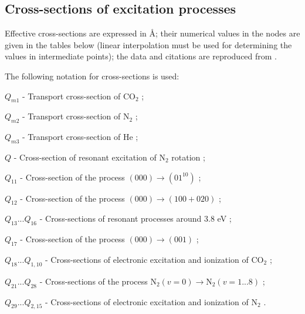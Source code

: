 \documentclass{report}
\begin{document}
\begin{appendices}


\chapter{Cross-sections of excitation processes}
\label{appendix:crossections}

Effective cross-sections are expressed in Å; their numerical values in the nodes are given in the tables below (linear interpolation must be used for determining the values in intermediate points); the data and citations are reproduced from \cite{Karlov-1978}.


The following notation for cross-sections is used:

$Q_{m1}$ - Transport cross-section of {CO$_2$} \cite{Lowke-1973};

$Q_{m2}$ - Transport cross-section of {N$_2$} \cite{Frost-1962};

$Q_{m3}$ - Transport cross-section of He \cite{Lowke-1973};

$Q$ - Cross-section of resonant excitation of {N$_2$} rotation  \cite{Oksyuk-1966,Chandra-1973};

$Q_{11}$ - Cross-section of the process $(000)\rightarrow(01^10)$  \cite{Lowke-1973};

$Q_{12}$ - Cross-section of the process $(000)\rightarrow(100+020)$  \cite{Lowke-1973};

$Q_{13}...Q_{16}$ - Cross-sections of resonant processes around 3.8 eV  \cite{Lowke-1973};

$Q_{17}$ - Cross-section of the process $(000)\rightarrow(001)$  \cite{Lowke-1973};

$Q_{18}...Q_{1,10}$ - Cross-sections of electronic excitation and ionization of {CO$_2$}  \cite{Hake-1967};

$Q_{21}...Q_{28}$ - Cross-sections of the process {N$_2$}$(v=0)\rightarrow${N$_2$}$(v=1...8)$ \cite{Phelps-1968,Schulz-1962,Engelhardt-1964};

$Q_{29}...Q_{2,15}$ - Cross-sections of electronic excitation and ionization of {N$_2$} \cite{Engelhardt-1964}. 


\end{appendices}
\end{document}
